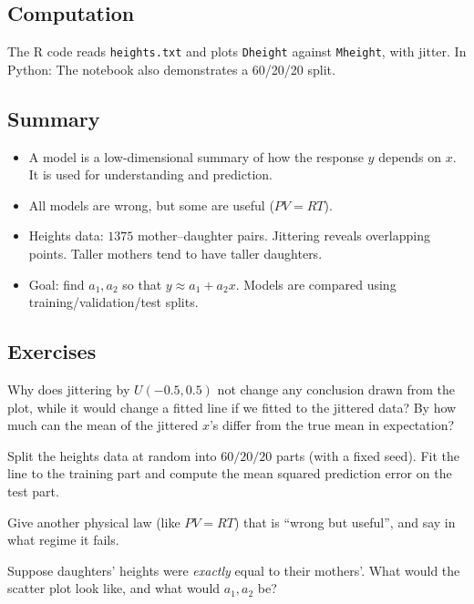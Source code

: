 \subsection{Computation}
The R code reads \texttt{heights.txt} and plots \texttt{Dheight} against \texttt{Mheight}, with
jitter. In Python:
The notebook  also demonstrates a 60/20/20 split.

\subsection{Summary}
\begin{itemize}
  \item A model is a low-dimensional summary of how the response $y$ depends on $x$. It is used for understanding and prediction.
  \item All models are wrong, but some are useful ($PV=RT$).
  \item Heights data: $1375$ mother--daughter pairs. Jittering reveals overlapping points. Taller mothers tend to have taller daughters.
  \item Goal: find $a_1,a_2$ so that $y\approx a_1+a_2x$. Models are compared using training/validation/test splits.
\end{itemize}

\subsection{Exercises}
\begin{problem}\label{prob:L04-1}
Why does jittering by $U(-0.5,0.5)$ not change any conclusion drawn from the plot, while it would change a fitted line if we fitted to the jittered data? By how much can the mean of the jittered $x$'s differ from the true mean in expectation?
\end{problem}
\begin{problem}\label{prob:L04-2}
Split the heights data at random into $60/20/20$ parts (with a fixed seed). Fit the line to the training part and compute the mean squared prediction error on the test part.
\end{problem}
\begin{problem}\label{prob:L04-3}
Give another physical law (like $PV=RT$) that is ``wrong but useful'', and say in what regime it fails.
\end{problem}
\begin{problem}\label{prob:L04-4}
Suppose daughters' heights were \emph{exactly} equal to their mothers'. What would the scatter plot look like, and what would $a_1,a_2$ be?
\end{problem}

